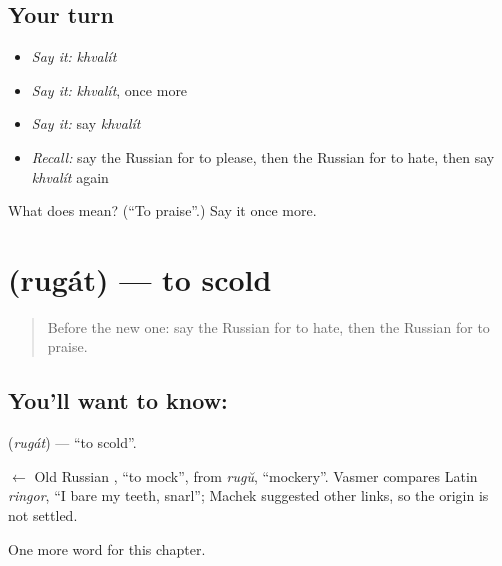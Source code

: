 \subsection*{Your turn}
\begin{itemize}
\raggedright
  \item \emph{Say it:} \emph{khvalít}
  \item \emph{Say it:} \emph{khvalít}, once more
  \item \emph{Say it:} say \emph{khvalít}
  \item \emph{Recall:} say the Russian for to please, then the Russian for to hate, then say \emph{khvalít} again
\end{itemize}

\begin{tcolorbox}[breakable,colback=teal!4,colframe=teal!35!black,title={Before you move on}]
What does  mean? (\textquotedblleft{}To praise\textquotedblright{}.) Say it once more.
\end{tcolorbox}
\section[\texorpdfstring{\ru{ругать} (rugát)}{ругать (rugát)}]{ (rugát) — to scold}

\label{lesson:RU-C144-rugat}



\begin{quote}
Before the new one: say the Russian for to hate, then the Russian for to praise.
\end{quote}

\subsection*{You'll want to know: }
\textbf{} (\emph{rugát}) — \textquotedblleft{}to scold\textquotedblright{}.

\begin{cousinweb}
\textbf{} $\leftarrow$ Old Russian \emph{}, \textquotedblleft{}to mock\textquotedblright{}, from \emph{rugŭ}, \textquotedblleft{}mockery\textquotedblright{}. Vasmer compares Latin \emph{ringor}, \textquotedblleft{}I bare my teeth, snarl\textquotedblright{}; Machek suggested other links, so the origin is not settled.
\end{cousinweb}

\begin{grammarlens}[title={What you've built}]
One more word for this chapter.
\end{grammarlens}

